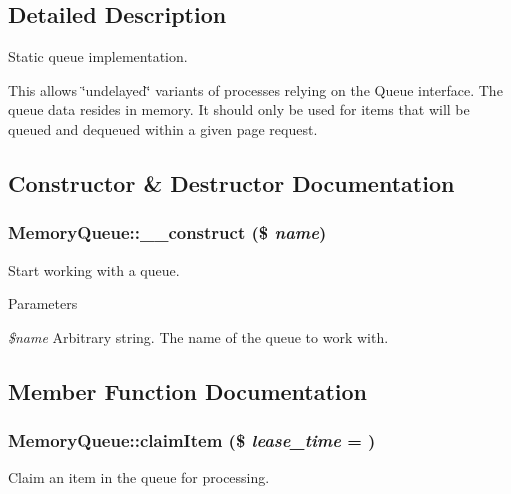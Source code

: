 \subsection{Detailed Description}
Static queue implementation.

This allows \char`\"{}undelayed\char`\"{} variants of processes relying on the Queue interface. The queue data resides in memory. It should only be used for items that will be queued and dequeued within a given page request. 

\subsection{Constructor \& Destructor Documentation}
\hypertarget{classMemoryQueue_a83e620eced2895763ebad69f615462b2}{
\subsubsection[{\_\-\_\-construct}]{\setlength{\rightskip}{0pt plus 5cm}MemoryQueue::\_\-\_\-construct (\$ {\em name})}}
\label{classMemoryQueue_a83e620eced2895763ebad69f615462b2}
Start working with a queue.


\begin{DoxyParams}{Parameters}
\item[{\em \$name}]Arbitrary string. The name of the queue to work with. \end{DoxyParams}


\subsection{Member Function Documentation}
\hypertarget{classMemoryQueue_a24cba156a854a7b4b6c81c3d2614508d}{
\subsubsection[{claimItem}]{\setlength{\rightskip}{0pt plus 5cm}MemoryQueue::claimItem (\$ {\em lease\_\-time} = {})}}
\label{classMemoryQueue_a24cba156a854a7b4b6c81c3d2614508d}
Claim an item in the queue for processing.


